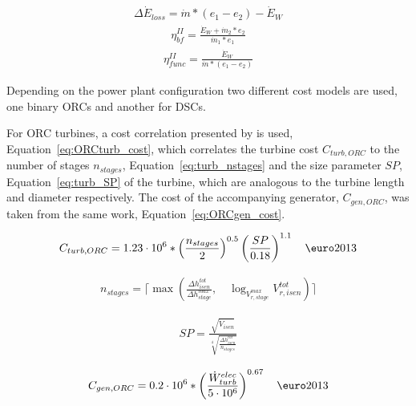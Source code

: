         \begin{align}
            \Delta\Dot{E}_{loss} = \Dot{m}*(e_1 - e_2) - \Dot{E}_W \label{eq:turb_exloss}
        \end{align}
        \begin{align}
            \eta_{bf}^{II}= \frac{\Dot{E}_W + \Dot{m}_2*e_2}{\Dot{m}_1*e_1} \label{eq:turb_exBF}
        \end{align}
        \begin{align}
            \eta_{func}^{II}= \frac{\Dot{E}_W}{\Dot{m}*(e_1 - e_2)} \label{eq:turb_exFUNC}
        \end{align}

        Depending on the power plant configuration two different cost models are used, one binary \acp{ORC} and another for \acp{DSC}. 
        
        For \ac{ORC} turbines, a cost correlation presented by \citeauthor{Astolfi2014B} \cite{Astolfi2014B} is used, Equation~\ref{eq:ORCturb_cost}, which correlates the turbine cost \(C_{turb, ORC}\) to the number of stages \(n_{stages}\), Equation~\ref{eq:turb_nstages} and the size parameter \(SP\), Equation~\ref{eq:turb_SP} of the turbine, which are analogous to the turbine length and diameter respectively. The cost of the accompanying generator, \(C_{gen, ORC}\), was taken from the same work, Equation~\ref{eq:ORCgen_cost}.

        \begin{align}
            C_{turb, ORC} = 1.23\cdot 10^6 *\left(\frac{n_{stages}}{2}\right)^{0.5} \left(\frac{SP}{0.18}\right)^{1.1} \quad  \textup{\euro}2013\label{eq:ORCturb_cost}
        \end{align}
        
        \begin{align}
            n_{stages}= \Biggl \lceil \max \left( \frac{\Delta h_{isen}^{tot}}{\Delta h_{stage}^{max}} , \quad \log_{V_{r, stage}^{max}} V_{r, isen}^{tot} \right) \Biggr \rceil \label{eq:turb_nstages}
        \end{align}
        
        \begin{align}
            SP = \frac{\sqrt{\Dot{V}_{isen}}}{\sqrt[4]{\frac{\Delta h_{isen}^{tot}}{n_{stages}}}} \label{eq:turb_SP}
        \end{align}
        
        \begin{align}
            C_{gen, ORC} = 0.2\cdot 10^6 *\left(\frac{\Dot{W}_{turb}^{elec}}{5\cdot 10^6}\right)^{0.67}  \quad \textup{\euro}2013 \label{eq:ORCgen_cost}
        \end{align}

